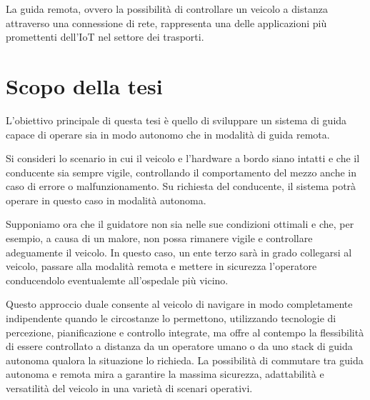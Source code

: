\noindent La guida remota, ovvero la possibilità di controllare un veicolo a distanza attraverso una connessione di rete, rappresenta una delle applicazioni più promettenti dell'IoT nel settore dei trasporti.

\section{Scopo della tesi}
L'obiettivo principale di questa tesi è quello di sviluppare un sistema di guida capace di operare sia in modo autonomo che in modalità di guida remota.

\noindent Si consideri lo scenario in cui il veicolo e l'hardware a bordo siano intatti e che il conducente sia sempre vigile, controllando il comportamento del mezzo anche in caso di errore o malfunzionamento. Su richiesta del conducente, il sistema potrà operare in questo caso in modalità autonoma.

\noindent Supponiamo ora che il guidatore non sia nelle sue condizioni ottimali e che, per esempio, a causa di un malore, non possa rimanere vigile e controllare adeguamente il veicolo. In questo caso, un ente terzo sarà in grado collegarsi al veicolo, passare alla modalità remota e mettere in sicurezza l'operatore conducendolo eventualemte all'ospedale più vicino.

\noindent Questo approccio duale consente al veicolo di navigare in modo completamente indipendente quando le circostanze lo permettono, utilizzando tecnologie di percezione, pianificazione e controllo integrate, ma offre al contempo la flessibilità di essere controllato a distanza da un operatore umano o da uno stack di guida autonoma qualora la situazione lo richieda. La possibilità di commutare tra guida autonoma e remota mira a garantire la massima sicurezza, adattabilità e versatilità del veicolo in una varietà di scenari operativi.

